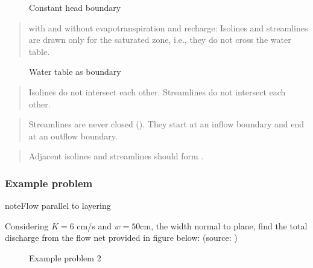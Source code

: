 \documentclass[letterpaper,10pt,english]{sphinxmanual}
\begin{document}
\begin{figure}[htbp]
\centering
\capstart

\noindent{}
\caption{Constant head boundary}\label{\detokenize{contents/flow/lecture_06/16_darcy_law_3D:id2}}\end{figure}
\begin{quote}

 with and without evapotranspiration and recharge: Isolines and streamlines are drawn only for the saturated zone, i.e., they do not cross the water table.
\end{quote}

\begin{figure}[htbp]
\centering
\capstart

\noindent{}
\caption{Water table as boundary}\label{\detokenize{contents/flow/lecture_06/16_darcy_law_3D:id3}}\end{figure}
\begin{quote}

Isolines do not intersect each other. Streamlines do not intersect each other.
\end{quote}
\begin{quote}

Streamlines are never closed (). They start at an inflow boundary and end at an outflow boundary.
\end{quote}
\begin{quote}

Adjacent isolines and streamlines should form .
\end{quote}


\subsubsection{Example problem}
\label{\detokenize{contents/flow/lecture_06/16_darcy_law_3D:id4}}
\begin{sphinxadmonition}{note}{Flow parallel to layering}

Considering \(K = 6\) cm/s and \(w = 50 \)cm, the width normal to plane, find the total discharge from the flow net provided in figure below: 
(source: )

\begin{figure}[H]
\centering
\capstart

\noindent{}
\caption{Example problem 2\sphinxcode{\sphinxupquote{ }}}\label{\detokenize{contents/flow/lecture_06/16_darcy_law_3D:ex2}}\end{figure}
\end{sphinxadmonition}
\end{document}
